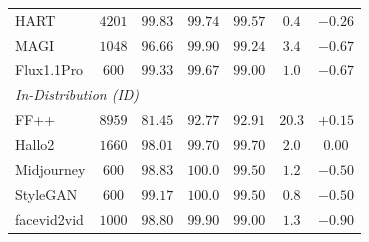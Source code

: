 \documentclass[10pt,twocolumn,letterpaper]{article}
\begin{document}
\begin{table}[t]
\begin{tabular}{l c c c c c c}
HART        & $4201$ & $99.83$ & $99.74$ & $99.57$ & $0.4$  & $-0.26$ \\
MAGI        & $1048$ & $96.66$ & $99.90$ & $99.24$ & $3.4$  & $-0.67$ \\
Flux1.1Pro  & $600$  & $99.33$ & $99.67$ & $99.00$ & $1.0$  & $-0.67$ \\
\midrule
\multicolumn{7}{l}{\emph{In-Distribution (ID)}} \\
FF++        & $8959$ & $81.45$ & $92.77$ & $92.91$ & $20.3$ & $+0.15$ \\
Hallo2      & $1660$ & $98.01$ & $99.70$ & $99.70$ & $2.0$ & $0.00$ \\
Midjourney  & $600$  & $98.83$ & $100.0$ & $99.50$ & $1.2$ & $-0.50$ \\
StyleGAN    & $600$  & $99.17$ & $100.0$ & $99.50$ & $0.8$ & $-0.50$ \\
facevid2vid & $1000$ & $98.80$ & $99.90$ & $99.00$ & $1.3$ & $-0.90$ \\
\bottomrule
\end{tabular}
\end{table}
\end{document}
